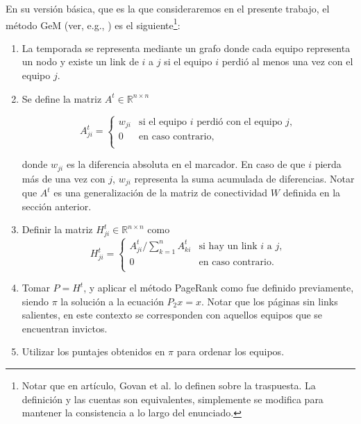 En su versi\'on b\'asica, que es la que consideraremos en el presente trabajo, el m\'etodo GeM (ver, e.g., \cite[Secci\'on GeM Ranking Method]{Govan2008}) 
es el siguiente\footnote{Notar que en art\'iculo, Govan et al. \cite{Govan2008} lo definen sobre la traspuesta. La definici\'on y las cuentas son
equivalentes, simplemente se modifica para mantener la consistencia a lo largo del enunciado.}:
\begin{enumerate}
\item La temporada se representa mediante un grafo donde cada equipo representa un nodo y existe un link de $i$ a $j$ si el equipo $i$ perdi\'o al
menos una vez con el equipo $j$.
\item Se define la matriz $A^t \in \mathbb{R}^{n \times n}$

\begin{equation*}
A_{ji}^t = \left\{
	\begin{array}{cl}
	w_{ji} & \text{si el equipo } i \text{ perdi\'o con el equipo } j,\\
	0 & \text{en caso contrario, }\\
	\end{array} \right.
\end{equation*}

\noindent donde $w_{ji}$ es la diferencia absoluta en el marcador. En caso de que $i$ pierda m\'as de una vez con $j$, $w_{ji}$ representa la suma
acumulada de diferencias. Notar que $A^t$ es una generalizaci\'on de la matriz de conectividad $W$ definida en la secci\'on anterior.

\item Definir la matriz $H_{ji}^t \in \mathbb{R}^{n \times n}$ como
\begin{equation*}
H_{ji}^t = \left\{
	\begin{array}{cl}
	A_{ji}^t/\sum_{k = 1}^n A_{ki}^t & \text{si hay un link } i \text{ a } j,\\
	0 & \text{en caso contrario.}\\
	\end{array} \right.
\end{equation*}

\item Tomar $P = H^t$, y aplicar el m\'etodo PageRank como fue definido previamente, siendo $\pi$ la soluci\'on a la ecuaci\'on $P_2 x = x$. Notar que 
los p\'aginas sin links salientes, en este contexto se corresponden con aquellos equipos que se encuentran invictos.

\item Utilizar los puntajes obtenidos en $\pi$ para ordenar los equipos.
\end{enumerate}

